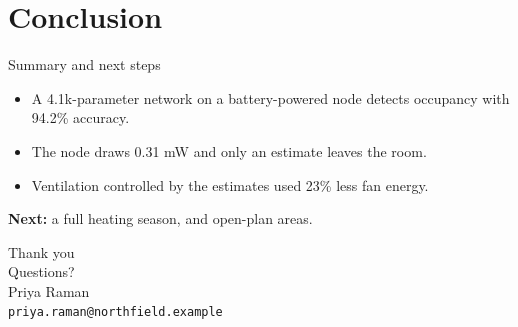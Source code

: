 \documentclass[aspectratio=169,11pt]{beamer}
\begin{document}
\section{Conclusion}

\begin{frame}{Summary and next steps}
  \begin{itemize}
    \item A 4.1k-parameter network on a battery-powered node detects occupancy with 94.2\% accuracy.
    \item The node draws 0.31 mW and only an estimate leaves the room.
    \item Ventilation controlled by the estimates used 23\% less fan energy.
  \end{itemize}
  \vspace{1em}
  \textbf{Next:} a full heating season, and open-plan areas.
\end{frame}

\begin{frame}
  \centering
  {\Huge Thank you}\\[1.5em]
  {\large Questions?}\\[2em]
  Priya Raman\\
  \texttt{priya.raman@northfield.example}
\end{frame}
\end{document}
